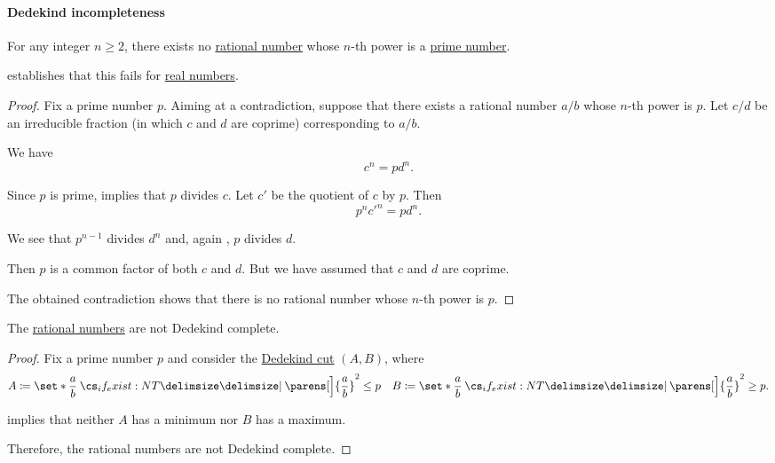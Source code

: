 \paragraph{Dedekind incompleteness}

\begin{proposition}\label{thm:nth_root_is_not_rational}
  For any integer \( n \geq 2 \), there exists no \hyperref[def:rational_numbers]{rational number} whose \( n \)-th power is a \hyperref[def:prime_number]{prime number}.
\end{proposition}
\begin{comments}
  \item {} establishes that this fails for \hyperref[def:real_numbers]{real numbers}.
\end{comments}
\begin{proof}
  Fix a prime number \( p \). Aiming at a contradiction, suppose that there exists a rational number \( a / b \) whose \( n \)-th power is \( p \). Let \( c / d \) be an irreducible fraction (in which \( c \) and \( d \) are coprime) corresponding to \( a / b \).

  We have
  \begin{equation*}
    c^n = p d^n.
  \end{equation*}

  Since \( p \) is prime,  implies that \( p \) divides \( c \). Let \( c' \) be the quotient of \( c \) by \( p \). Then
  \begin{equation*}
    p^n c'^n = p d^n.
  \end{equation*}

  We see that \( p^{n-1} \) divides \( d^n \) and, again , \( p \) divides \( d \).

  Then \( p \) is a common factor of both \( c \) and \( d \). But we have assumed that \( c \) and \( d \) are coprime.

  The obtained contradiction shows that there is no rational number whose \( n \)-th power is \( p \).
\end{proof}

\begin{corollary}\label{thm:rational_numbers_not_dedekind_complete}
  The \hyperref[def:rational_numbers]{rational numbers} are not Dedekind complete.
\end{corollary}
\begin{proof}
  Fix a prime number \( p \) and consider the \hyperref[def:dedekind_cut]{Dedekind cut} \( (A, B) \), where
  \begin{align*}
    A \coloneqq \set*{ \frac a b \given* \parens[\Big]{ \frac a b }^2 \leq p }
    &&
    B \coloneqq \set*{ \frac a b \given* \parens[\Big]{ \frac a b }^2 \geq p }.
  \end{align*}

   implies that neither \( A \) has a minimum nor \( B \) has a maximum.

  Therefore, the rational numbers are not Dedekind complete.
\end{proof}
